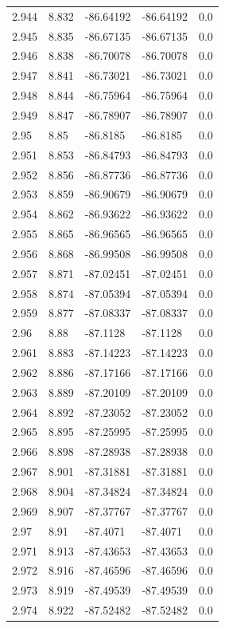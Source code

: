 \begin{tabular}{lllll}
2.944 & 8.832 & -86.64192 & -86.64192 & 0.0 \\
2.945 & 8.835 & -86.67135 & -86.67135 & 0.0 \\
2.946 & 8.838 & -86.70078 & -86.70078 & 0.0 \\
2.947 & 8.841 & -86.73021 & -86.73021 & 0.0 \\
2.948 & 8.844 & -86.75964 & -86.75964 & 0.0 \\
2.949 & 8.847 & -86.78907 & -86.78907 & 0.0 \\
2.95 & 8.85 & -86.8185 & -86.8185 & 0.0 \\
2.951 & 8.853 & -86.84793 & -86.84793 & 0.0 \\
2.952 & 8.856 & -86.87736 & -86.87736 & 0.0 \\
2.953 & 8.859 & -86.90679 & -86.90679 & 0.0 \\
2.954 & 8.862 & -86.93622 & -86.93622 & 0.0 \\
2.955 & 8.865 & -86.96565 & -86.96565 & 0.0 \\
2.956 & 8.868 & -86.99508 & -86.99508 & 0.0 \\
2.957 & 8.871 & -87.02451 & -87.02451 & 0.0 \\
2.958 & 8.874 & -87.05394 & -87.05394 & 0.0 \\
2.959 & 8.877 & -87.08337 & -87.08337 & 0.0 \\
2.96 & 8.88 & -87.1128 & -87.1128 & 0.0 \\
2.961 & 8.883 & -87.14223 & -87.14223 & 0.0 \\
2.962 & 8.886 & -87.17166 & -87.17166 & 0.0 \\
2.963 & 8.889 & -87.20109 & -87.20109 & 0.0 \\
2.964 & 8.892 & -87.23052 & -87.23052 & 0.0 \\
2.965 & 8.895 & -87.25995 & -87.25995 & 0.0 \\
2.966 & 8.898 & -87.28938 & -87.28938 & 0.0 \\
2.967 & 8.901 & -87.31881 & -87.31881 & 0.0 \\
2.968 & 8.904 & -87.34824 & -87.34824 & 0.0 \\
2.969 & 8.907 & -87.37767 & -87.37767 & 0.0 \\
2.97 & 8.91 & -87.4071 & -87.4071 & 0.0 \\
2.971 & 8.913 & -87.43653 & -87.43653 & 0.0 \\
2.972 & 8.916 & -87.46596 & -87.46596 & 0.0 \\
2.973 & 8.919 & -87.49539 & -87.49539 & 0.0 \\
2.974 & 8.922 & -87.52482 & -87.52482 & 0.0 \\

\end{tabular}
